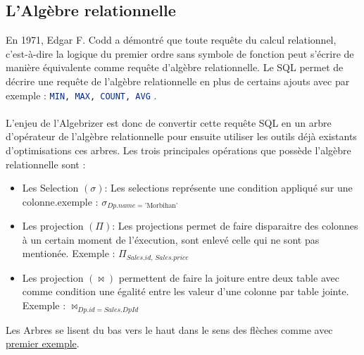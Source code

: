 \documentclass[12pt,a4paper]{article}
\begin{document}
\subsection{L'Algèbre relationnelle}
En 1971, Edgar F. Codd a démontré que toute requête du calcul relationnel, c'est-à-dire la logique du premier ordre sans symbole de fonction peut s'écrire de manière équivalente comme requête d'algèbre relationnelle. Le SQL permet de décrire une requête de l'algèbre relationnelle en plus de certains ajouts avec par exemple : \lstinline[language=SQL]!MIN, MAX, COUNT, AVG! .\\~\\
L'enjeu de l'Algebrizer est donc de convertir cette requête SQL en un arbre d'opérateur de l'algèbre relationnelle pour ensuite utiliser les outils déjà existants d'optimisations ces arbres.
Les trois principales opérations que possède l'algèbre relationnelle sont :
\begin{itemize}
    \item Les Selection \((\sigma)\): Les selections représente une condition appliqué sur une colonne.exemple : \(\sigma_{Dp.name = \text{'Morbihan'}}\)
    \item Les projection \((\Pi)\): Les projections permet de faire disparaitre des colonnes à un certain moment de l'éxecution, sont enlevé celle qui ne sont pas mentionée.  Exemple : \(\Pi_{Sales.id,\,Sales.price}\)
    \item Les projection \((\Join)\) permettent de faire la joiture entre deux table avec comme condition une égalité entre les valeur d'une colonne par table jointe. Exemple : \(\Join_{Dp.id = Sales.DpId}\)
\end{itemize}

Les Arbres se lisent du bas vers le haut dans le sens des flèches comme avec \href{fig:arbre:one}{premier exemple}.
\end{document}
